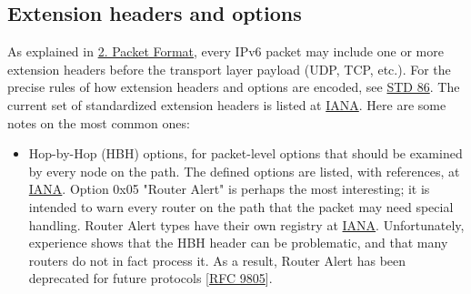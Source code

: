 \documentclass[
]{article}
\begin{document}
\subsection{Extension headers and
options}\label{extension-headers-and-options}

As explained in \hyperref[packet-format]{2. Packet Format}, every IPv6
packet may include one or more extension headers before the transport
layer payload (UDP, TCP, etc.). For the precise rules of how extension
headers and options are encoded, see
\href{https://www.rfc-editor.org/info/std86}{STD 86}. The current set of
standardized extension headers is listed at
\href{https://www.iana.org/assignments/ipv6-parameters/ipv6-parameters.xhtml\#extension-header}{IANA}.
Here are some notes on the most common ones:

\begin{itemize}
\item
  Hop-by-Hop (HBH) options, for packet-level options that should be
  examined by every node on the path. The defined options are listed,
  with references, at
  \href{https://www.iana.org/assignments/ipv6-parameters/ipv6-parameters.xhtml\#ipv6-parameters-2}{IANA}.
  Option 0x05 "Router Alert" is perhaps the most interesting; it is
  intended to warn every router on the path that the packet may need
  special handling. Router Alert types have their own registry at
  \href{https://www.iana.org/assignments/ipv6-routeralert-values/ipv6-routeralert-values.xhtml}{IANA}.
  Unfortunately, experience shows that the HBH header can be
  problematic, and that many routers do not in fact process it. As a
  result, Router Alert has been deprecated for future protocols
  {[}\href{https://www.rfc-editor.org/info/rfc9805}{RFC 9805}{]}.


\end{itemize}
\end{document}
